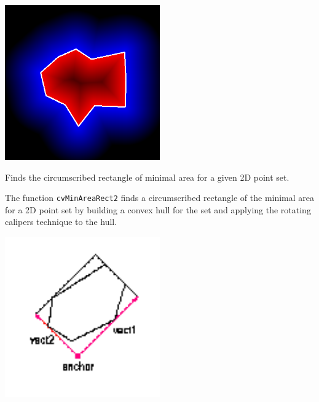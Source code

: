 \includegraphics[width=0.5\textwidth]{pics/pointpolygon.png}

\label{MinAreaRect2}

Finds the circumscribed rectangle of minimal area for a given 2D point set.


\begin{description}
\end{description}

The function \texttt{cvMinAreaRect2} finds a circumscribed rectangle of the minimal area for a 2D point set by building a convex hull for the set and applying the rotating calipers technique to the hull.


\includegraphics[width=0.5\textwidth]{pics/minareabox.png}

\label{MinEnclosingCircle}

